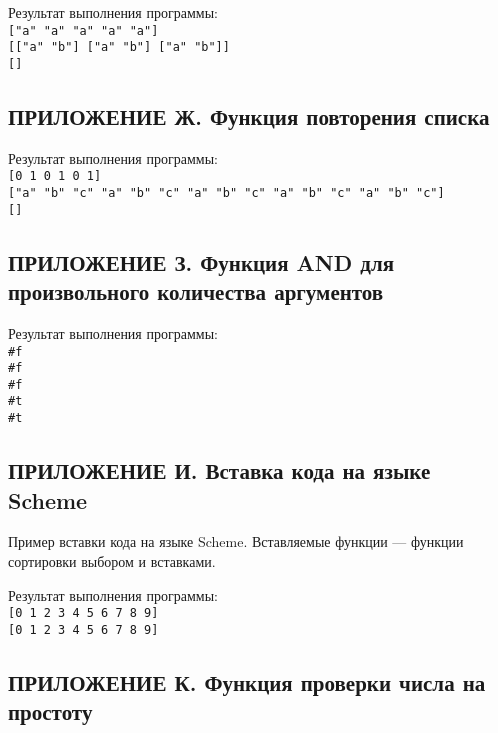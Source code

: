     Результат выполнения программы:
    \\ \verb,["a" "a" "a" "a" "a"],
    \\ \verb,[["a" "b"] ["a" "b"] ["a" "b"]],
    \\ \verb,[],

    \subsection*{ПРИЛОЖЕНИЕ Ж. Функция повторения списка}
    

    Результат выполнения программы:
    \\ \verb,[0 1 0 1 0 1],
    \\ \verb,["a" "b" "c" "a" "b" "c" "a" "b" "c" "a" "b" "c" "a" "b" "c"],
    \\ \verb,[],

    \subsection*{ПРИЛОЖЕНИЕ З. Функция AND для произвольного количества аргументов}
    

    Результат выполнения программы:
    \\ \verb,#f,
    \\ \verb,#f,
    \\ \verb,#f,
    \\ \verb,#t,
    \\ \verb,#t,

    \subsection*{ПРИЛОЖЕНИЕ И. Вставка кода на языке Scheme}
    Пример вставки кода на языке Scheme.
    Вставляемые функции --- функции сортировки выбором и вставками.
    

    Результат выполнения программы:
    \\ \verb,[0 1 2 3 4 5 6 7 8 9],
    \\ \verb,[0 1 2 3 4 5 6 7 8 9],

    \subsection*{ПРИЛОЖЕНИЕ К. Функция проверки числа на простоту}
    

